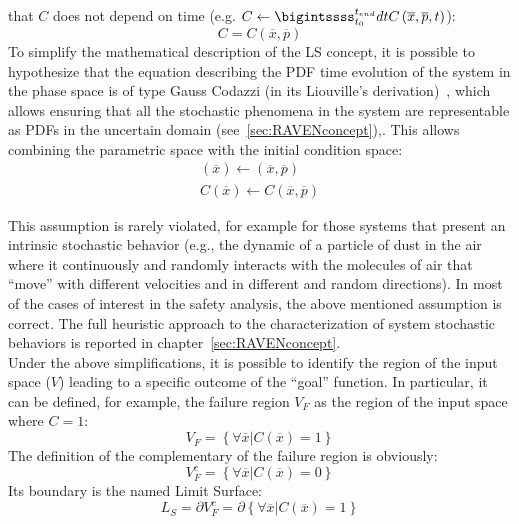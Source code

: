 that $C$ does not depend on time (e.g. $C\leftarrow 
\bigintssss_{t_{0}}^{t_{end}}dtC\left(  \overline{x},\overline{p},t \right )$):
\begin{equation}
  \label{eq:goalFunction}
  C = C\left (\overline{x},\overline{p}\right ) 
\end{equation}
To simplify the mathematical description of the LS concept, it is 
possible to hypothesize that the 
equation describing the PDF time evolution of the system in the phase 
space is of type Gauss 
Codazzi (in its Liouville’s derivation)~\cite{}, which allows ensuring that all the 
stochastic phenomena in 
the system are representable as PDFs in the uncertain domain 
(see~\ref{sec:RAVENconcept}),. This allows combining the 
parametric space with the initial condition space:
\begin{equation}
  \label{eq:goalFunctionCodazzi}
  \begin{matrix} 
  \left ( \overline{x} \right ) \leftarrow \left ( \overline{x},\overline{p} \right ) \\
  C\left ( \overline{x} \right ) \leftarrow C\left ( \overline{x},\overline{p} \right )
  \end{matrix}
\end{equation}

This assumption is rarely violated, for example for those systems that 
present an intrinsic 
stochastic behavior (e.g., the dynamic of a particle of dust in the air 
where it continuously and 
randomly interacts with the molecules of air that ``move'' with different velocities and in different 
and random directions). In most of the cases of interest in the safety analysis, the above 
mentioned assumption is correct. The full heuristic approach to the characterization of system stochastic behaviors is reported in chapter~\ref{sec:RAVENconcept}.
\\Under the above simplifications, it is possible to identify the region of the input space ($V$) 
leading to a specific outcome of the ``goal'' function. In particular, it can be defined, for example, 
the failure region $V_{F}$ as the region of the input space where $C=1$:
\begin{equation}
 \label{eq:failureRegion}
V_{F}=\left \{ \forall \overline{x} | C\left ( \overline{x} \right ) = 1 \right \}
\end{equation}
The definition of the complementary of the failure region is obviously:
\begin{equation}
V_{F}^{c}=\left \{ \forall \overline{x} | C\left ( \overline{x} \right ) = 0 \right \}
\end{equation}
Its boundary is the named Limit Surface:
\begin{equation}
L_{S}= \partial V_{F}^{c}= \partial      \left \{ \forall \overline{x} | C\left ( \overline{x} \right ) = 1 \right \}
\end{equation}

